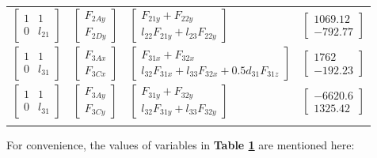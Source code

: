 \begin{table}
\begin{tabular}{llll}
		$ \begin{bmatrix} 1 & 1\\ 0 & l_{21} \end{bmatrix}  $  & 
		$ \begin{bmatrix} F_{2Ay}\\ F_{2Dy} \end{bmatrix} $ & 
		$ \begin{bmatrix} F_{21y}+F_{22y}\\ l_{22}F_{21y}+l_{23}F_{22y} \end{bmatrix} $ &
		$ \begin{bmatrix} 1069.12 \\ -792.77 \end{bmatrix} $\\\addlinespace[1.5ex]
		$ \begin{bmatrix} 1 & 1\\ 0 & l_{31} \end{bmatrix}  $  & 
		$ \begin{bmatrix} F_{3Ax}\\ F_{3Cx} \end{bmatrix} $ & 
		$ \begin{bmatrix} F_{31x}+F_{32x}\\ l_{32}F_{31x}+l_{33}F_{32x}+0.5d_{31}F_{31z} \end{bmatrix} $ &
		$ \begin{bmatrix} 1762 \\ -192.23 \end{bmatrix} $\\\addlinespace[1.5ex]
		$ \begin{bmatrix} 1 & 1\\ 0 & l_{31} \end{bmatrix}  $  & 
		$ \begin{bmatrix} F_{3Ay}\\ F_{3Cy} \end{bmatrix} $ & 
		$ \begin{bmatrix} F_{31y}+F_{32y}\\ l_{32}F_{31y}+l_{33}F_{32y} \end{bmatrix} $ &
		$ \begin{bmatrix} -6620.6\\ 1325.42 \end{bmatrix} $\\\addlinespace[1.5ex]
		\bottomrule
	\end{tabular}
	\label{soltab}
\end{table}

For convenience, the values of variables in \textbf{Table \ref{soltab}} are mentioned here:

